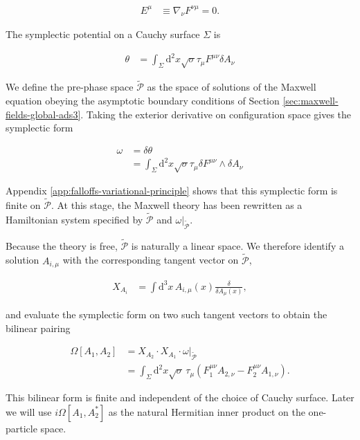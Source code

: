 \begin{align}
E^{\mu}&\equiv \nabla _{\nu}F^{\nu \mu}=0.
\end{align}

The symplectic potential on a Cauchy surface $\Sigma$ is

\begin{align}
\theta & =\int _{\Sigma}\mathrm{d}^{2}x\sqrt{ \sigma }\tau _{\mu}F^{\mu \nu}\delta A_{\nu}
\end{align}

We define the pre-phase space $\widetilde{\mathcal{P}}$ as the space of solutions of the Maxwell equation obeying the asymptotic boundary conditions of Section \ref{sec:maxwell-fields-global-ads3}. Taking the exterior derivative on configuration space gives the symplectic form

\begin{align}
\omega & =\delta \theta \\
 & =\int _{\Sigma}\mathrm{d}^{2}x\sqrt{ \sigma }\tau _{\mu}\delta F^{\mu \nu}\wedge \delta A_{\nu}
\end{align}

Appendix \ref{app:falloffs-variational-principle} shows that this symplectic form is finite on $\widetilde{\mathcal{P}}$. At this stage, the Maxwell theory has been rewritten as a Hamiltonian system specified by $\widetilde{\mathcal{P}}$ and $\omega|_{\widetilde{\mathcal{P}}}$.

Because the theory is free, $\widetilde{\mathcal{P}}$ is naturally a linear space. We therefore identify a solution $A_{i,\mu}$ with the corresponding tangent vector on $\widetilde{\mathcal{P}}$,

\begin{align}
X_{A_{i}}&=\int \mathrm{d}^{3}x\,A_{i,\mu}(x)\frac{\delta}{\delta A_{\mu}(x)},
\end{align}

and evaluate the symplectic form on two such tangent vectors to obtain the bilinear pairing

\begin{align}
\Omega[A_{1},A_{2}]&=X_{A_{2}}\cdot X_{A_{1}}\cdot \omega|_{\widetilde{\mathcal{P}}} \\
 & =\int _{\Sigma}\mathrm{d}^{2}x\sqrt{ \sigma }\,\tau _{\mu}\left(F_{1}^{\mu \nu}A_{2,\nu}-F_{2}^{\mu \nu}A_{1,\nu}\right).
\end{align}

This bilinear form is finite and independent of the choice of Cauchy surface. Later we will use $i\Omega[A_{1},A_{2}^{*}]$ as the natural Hermitian inner product on the one-particle space.

